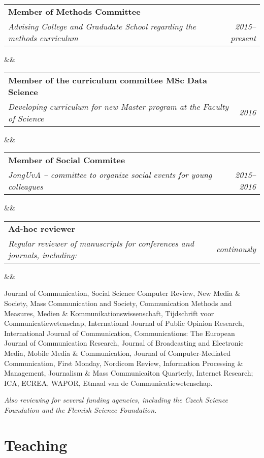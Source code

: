\documentclass[11pt,a4paper,sans]{moderncv}
\makeatletter
\renewcommand*{\cventry}[7][.25em]{
	\begin{tabular*}{\textwidth}{p{13cm}@{\extracolsep{\fill}}r}%
		{\bfseries #4} & {\bfseries #5} \\%
		{\itshape #3\ifthenelse{\equal{#6}{}}{}{, #6}} & {\itshape #2}\\%
	\end{tabular*}%
	\ifx&#7&%
	\else{\\\vbox{\small#7}}\fi%
        \par\addvspace{#1}}
\makeatother
\begin{document}
\cventry{2015--present}{Advising College and Gradudate School regarding the methods curriculum}{Member of Methods Committee}{}{}{}

\cventry{2016}{Developing curriculum for new Master program at the Faculty of Science}{Member of the curriculum committee MSc Data Science}{}{}{}

\cventry{2015--2016}{JongUvA -- committee to organize social events for young colleagues}{Member of Social Commitee}{}{}{}

\cventry{continously}{Regular reviewer of manuscripts for conferences and journals, including:}{Ad-hoc reviewer}{}{}{}
Journal of Communication, Social Science Computer
Review, New Media \& Society, Mass Communication and Society,
Communication Methods and Measures, Medien \&
Kommunikationswissenschaft, Tijdschrift voor
Communicatiewetenschap, International Journal of Public Opinion
Research, International Journal of Communication,
Communications: The European Journal of Communication
Research, Journal of Broadcasting and Electronic Media, Mobile
Media \& Communication, Journal of Computer-Mediated
Communication, First Monday, Nordicom Review, Information Processing \& Management,
Journalism \& Mass Communicaiton Quarterly, Internet Research;
ICA, ECREA, WAPOR, Etmaal van de Communicatiewetenschap.

\emph{Also reviewing for several funding agencies, including the Czech
Science Foundation and the Flemish Science Foundation.} \newline





\section{Teaching}







\end{document}
